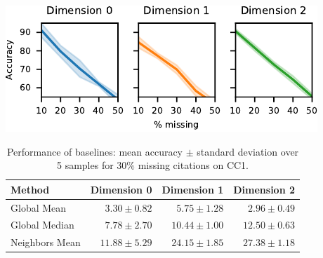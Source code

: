 \begin{table}[htbp]
  \centering
  \begin{minipage}[b]{0.35\linewidth}
    \includegraphics[width=\linewidth]{figures/performance_accuracy_transfer.pdf}
    \label{fig:transfer-learning}
  \end{minipage}
  \hspace{0.5cm}
  \begin{minipage}[b]{0.56\linewidth}
    \scriptsize{\begin{tabular}{lrrr}
      \toprule
      Method & Dimension 0 & Dimension 1 & Dimension 2 \\
      \midrule
      Global Mean & $3.30\pm0.82$ & $5.75\pm1.28$ & $2.96\pm0.49$ \\
      Global Median & $7.78\pm2.70$ & $10.44\pm1.00$ & $12.50\pm0.63$ \\
      Neighbors Mean & $11.88\pm5.29$ & $24.15\pm1.85$ & $27.38\pm1.18$ \\
      \bottomrule
    \end{tabular}}
    \vspace{9pt}
	\caption{Performance of baselines: mean accuracy $\pm$ standard deviation over 5 samples for $30\%$ missing citations on CC1.}\label{tab:baselines}
  \end{minipage}
\end{table}
